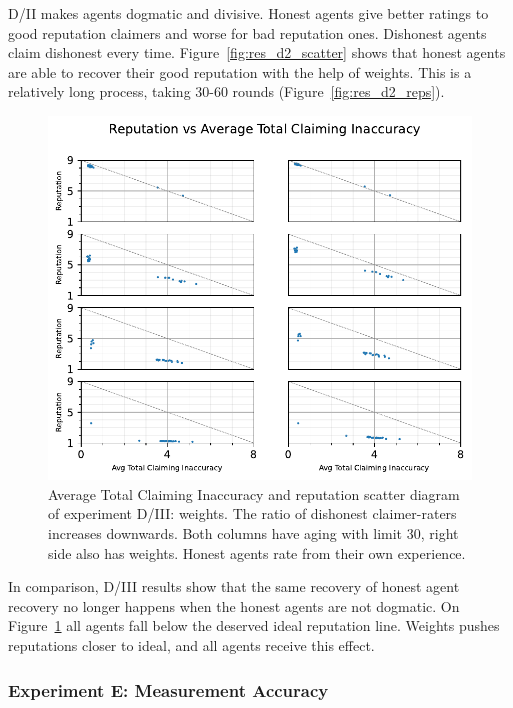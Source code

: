 \documentclass[%
    ]{\PathToTumTemplate/thesis/tum_thesis}
\begin{document}
D/II makes agents dogmatic and divisive.
Honest agents give better ratings to good reputation claimers and worse for bad reputation ones.
Dishonest agents claim dishonest every time.
Figure~\ref{fig:res_d2_scatter} shows that honest agents are able to recover their good reputation with the help of weights.
This is a relatively long process, taking 30-60 rounds (Figure~\ref{fig:res_d2_reps}).

\begin{figure}[tbp]
  \begin{center}
        \includegraphics[width=0.75\linewidth]	{../results/d3/AvgTotClaimInaccuracyAndReputationScatter_joined.pdf}
    \caption{
    Average Total Claiming Inaccuracy and reputation scatter diagram of experiment D/III: weights.
    The ratio of dishonest claimer-raters increases downwards.
    Both columns have aging with limit 30, right side also has weights.
    Honest agents rate from their own experience.
    }
    \label{fig:res_d3_scatter}
  \end{center}
\end{figure}

In comparison, D/III results show that the same recovery of honest agent recovery no longer happens when the honest agents are not dogmatic.
On Figure~\ref{fig:res_d3_scatter} all agents fall below the deserved ideal reputation line.
Weights pushes reputations closer to ideal, and all agents receive this effect.

\subsubsection{Experiment E: Measurement Accuracy}
\end{document}
